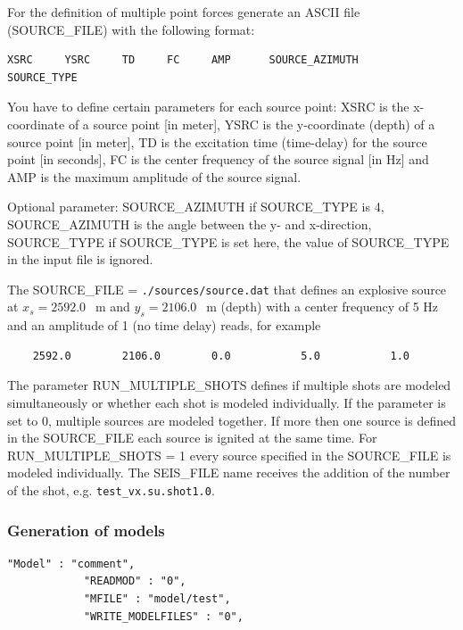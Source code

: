 \documentclass[11pt,onecolumn,oneside]{article}
\begin{document}
For the definition of multiple point forces generate an ASCII file (SOURCE\_FILE) with the following format:
\begin{verbatim}
XSRC     YSRC     TD     FC     AMP      SOURCE_AZIMUTH     SOURCE_TYPE
\end{verbatim}

You have to define certain parameters for each source point:\newline
XSRC is the x-coordinate of a source point [in meter],\newline
YSRC is the y-coordinate (depth) of a source point [in meter],\newline
TD is the excitation time (time-delay) for the source point [in seconds],\newline
FC is the center frequency of the source signal [in Hz] and\newline
AMP is the maximum amplitude of the source signal.

Optional parameter:\newline
SOURCE\_AZIMUTH if SOURCE\_TYPE is 4, SOURCE\_AZIMUTH is the angle between the y- and x-direction,\newline
SOURCE\_TYPE if SOURCE\_TYPE is set here, the value of SOURCE\_TYPE in the input file is ignored.

The SOURCE\_FILE = \texttt{./sources/source.dat} that defines an explosive source at $x_s=2592.0\;$~m and $y_s=2106.0\;$~m (depth) with a center frequency of 5 Hz and an amplitude of 1 (no time delay) reads, for example
\begin{verbatim}
	2592.0        2106.0        0.0           5.0           1.0
\end{verbatim}

The parameter RUN\_MULTIPLE\_SHOTS defines if multiple shots are modeled simultaneously or whether each shot is modeled individually. If the parameter is set to 0, multiple sources are modeled together. If more then one source is defined in the SOURCE\_FILE each source is ignited at the same time. For RUN\_MULTIPLE\_SHOTS = 1 every source specified in the SOURCE\_FILE is modeled individually. The SEIS\_FILE name receives the addition of the number of the shot, e.g. \texttt{test\_vx.su.shot1.0}.

\subsubsection{Generation of models}
\label{gen_of_mod}
\begin{verbatim}
"Model" : "comment",
			"READMOD" : "0",
			"MFILE" : "model/test",
			"WRITE_MODELFILES" : "0",
\end{verbatim}
\end{document}
